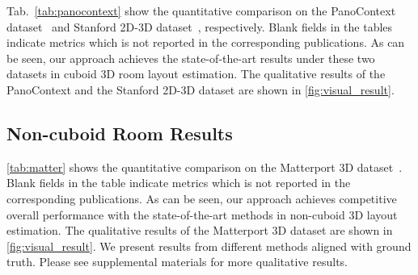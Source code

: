 \documentclass[runningheads]{llncs}
\begin{document}
Tab.~\ref{tab:panocontext} show the quantitative comparison on the PanoContext dataset~\cite{zhang2014panocontext} and Stanford 2D-3D dataset~\cite{armeni2017joint,zou2018layoutnet}, respectively. Blank fields in the tables indicate metrics which is not reported in the corresponding publications.
As can be seen, our approach achieves the state-of-the-art results under these two datasets in cuboid 3D room layout estimation. 
The qualitative results of the PanoContext and the Stanford 2D-3D dataset are shown in \cref{fig:visual_result}.


\subsection{Non-cuboid Room Results}\label{sec:non-cuboid_result}
\cref{tab:matter} shows the quantitative comparison on the Matterport 3D dataset~\cite{Matterport3D}. Blank fields in the table indicate metrics which is not reported in the corresponding publications.
As can be seen, our approach achieves competitive overall performance with the state-of-the-art methods in non-cuboid 3D layout estimation.
The qualitative results of the Matterport 3D dataset are shown in \cref{fig:visual_result}. We present results from different methods aligned with ground truth. Please see supplemental materials for more qualitative results.
\end{document}
